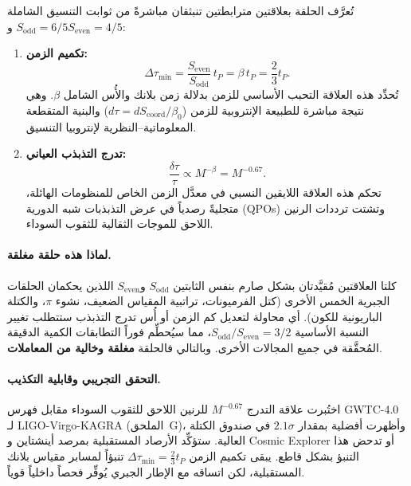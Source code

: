 \documentclass[11pt,a4paper]{article}
\begin{document}
	تُعرَّف الحلقة بعلاقتين مترابطتين تنبثقان مباشرةً من ثوابت التنسيق الشاملة \(S_{\mathrm{odd}} = 6/5\) و\(S_{\mathrm{even}} = 4/5\):
	
	\begin{enumerate}
		\item \textbf{تكميم الزمن:} 
		\begin{equation}
			\Delta \tau_{\min} = \frac{S_{\mathrm{even}}}{S_{\mathrm{odd}}} \, t_P = \beta \, t_P = \frac{2}{3} t_P.
			\label{eq:loop6-quantization}
		\end{equation}
		تُحدِّد هذه العلاقة التحبب الأساسي للزمن بدلالة زمن بلانك والأُس الشامل \(\beta\). وهي نتيجة مباشرة للطبيعة الإنتروبية للزمن (\(d\tau = dS_{\mathrm{coord}} / \beta_0\)) والبنية المتقطعة المعلوماتية–النظرية لإنتروبيا التنسيق.
		
		\item \textbf{تدرج التذبذب العياني:}
		\begin{equation}
			\frac{\delta \tau}{\tau} \propto M^{-\beta} = M^{-0.67}.
			\label{eq:loop6-fluctuation}
		\end{equation}
		تحكم هذه العلاقة اللايقين النسبي في معدَّل الزمن الخاص للمنظومات الهائلة، متجليةً رصدياً في عرض التذبذبات شبه الدورية (QPOs) وتشتت ترددات الرنين اللاحق للموجات الثقالية للثقوب السوداء.
	\end{enumerate}
	
	\paragraph{لماذا هذه حلقة مغلقة.}
	كلتا العلاقتين مُقيَّدتان بشكل صارم بنفس الثابتين \(S_{\mathrm{odd}}\) و\(S_{\mathrm{even}}\) اللذين يحكمان الحلقات الجبرية الخمس الأخرى (كتل الفرميونات، تراتبية المقياس الضعيف، نشوء \(\pi\)، والكتلة الباريونية للكون). أي محاولة لتعديل كم الزمن أو أُس تدرج التذبذب ستتطلب تغيير النسبة الأساسية \(S_{\mathrm{odd}}/S_{\mathrm{even}} = 3/2\)، مما سيُحطِّم فوراً التطابقات الكمية الدقيقة المُحقَّقة في جميع المجالات الأخرى. وبالتالي فالحلقة \textbf{مغلقة وخالية من المعاملات}.
	
	\paragraph{التحقق التجريبي وقابلية التكذيب.}
	اختُبرت علاقة التدرج \(M^{-0.67}\) للرنين اللاحق للثقوب السوداء مقابل فهرس GWTC-4.0 لـ LIGO-Virgo-KAGRA (الملحق~G)، وأظهرت أفضلية بمقدار \(2.1\sigma\) في صندوق الكتلة العالية. ستؤكِّد الأرصاد المستقبلية بمرصد أينشتاين و Cosmic Explorer أو تدحض هذا التنبؤ بشكل قاطع. يبقى تكميم الزمن \(\Delta \tau_{\min} = \frac{2}{3} t_P\) تنبؤاً لمسابر مقياس بلانك المستقبلية، لكن اتساقه مع الإطار الجبري يُوفِّر فحصاً داخلياً قوياً.
	
\end{document}
